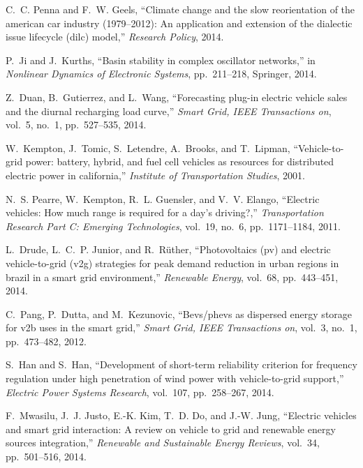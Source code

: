 \documentclass[final,12pt]{elsarticle}
\begin{document}
\begin{thebibliography}{10}

C.~C. Penna and F.~W. Geels, ``Climate change and the slow reorientation of the
  american car industry (1979--2012): An application and extension of the
  dialectic issue lifecycle (dilc) model,'' {\em Research Policy}, 2014.

\bibitem{}
P.~Ji and J.~Kurths, ``Basin stability in complex oscillator networks,'' in
  {\em Nonlinear Dynamics of Electronic Systems}, pp.~211--218, Springer, 2014.

Z.~Duan, B.~Gutierrez, and L.~Wang, ``Forecasting plug-in electric vehicle
  sales and the diurnal recharging load curve,'' {\em Smart Grid, IEEE
  Transactions on}, vol.~5, no.~1, pp.~527--535, 2014.

W.~Kempton, J.~Tomic, S.~Letendre, A.~Brooks, and T.~Lipman, ``Vehicle-to-grid
  power: battery, hybrid, and fuel cell vehicles as resources for distributed
  electric power in california,'' {\em Institute of Transportation Studies},
  2001.

N.~S. Pearre, W.~Kempton, R.~L. Guensler, and V.~V. Elango, ``Electric
  vehicles: How much range is required for a day’s driving?,'' {\em
  Transportation Research Part C: Emerging Technologies}, vol.~19, no.~6,
  pp.~1171--1184, 2011.

L.~Drude, L.~C.~P. Junior, and R.~R{\"u}ther, ``Photovoltaics (pv) and electric
  vehicle-to-grid (v2g) strategies for peak demand reduction in urban regions
  in brazil in a smart grid environment,'' {\em Renewable Energy}, vol.~68,
  pp.~443--451, 2014.

C.~Pang, P.~Dutta, and M.~Kezunovic, ``Bevs/phevs as dispersed energy storage
  for v2b uses in the smart grid,'' {\em Smart Grid, IEEE Transactions on},
  vol.~3, no.~1, pp.~473--482, 2012.

S.~Han and S.~Han, ``Development of short-term reliability criterion for
  frequency regulation under high penetration of wind power with
  vehicle-to-grid support,'' {\em Electric Power Systems Research}, vol.~107,
  pp.~258--267, 2014.

F.~Mwasilu, J.~J. Justo, E.-K. Kim, T.~D. Do, and J.-W. Jung, ``Electric
  vehicles and smart grid interaction: A review on vehicle to grid and
  renewable energy sources integration,'' {\em Renewable and Sustainable Energy
  Reviews}, vol.~34, pp.~501--516, 2014.


\end{thebibliography}
\end{document}
